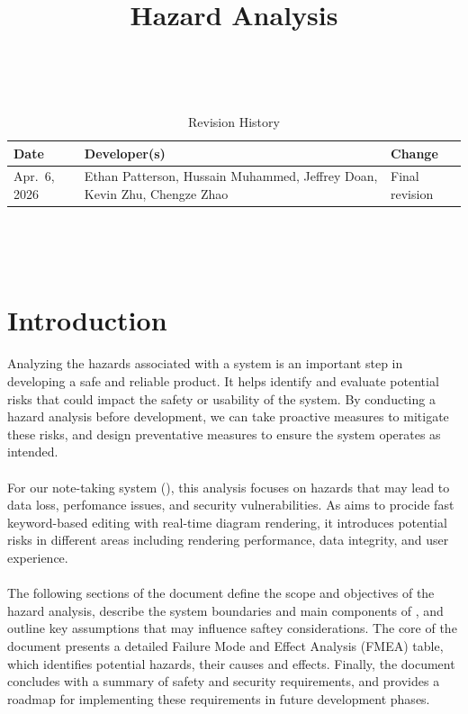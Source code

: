\documentclass{article}
\title{Hazard Analysis\\\progname}
\author{\authname}
\date{}
\begin{document}
\maketitle
\thispagestyle{empty}

~\newpage


\begin{table}[hp]
\caption{Revision History} \label{TblRevisionHistory}
\begin{tabularx}{\textwidth}{llX}
\toprule
\textbf{Date} & \textbf{Developer(s)} & \textbf{Change}\\
\midrule
Apr.\ 6, 2026 & Ethan Patterson, Hussain Muhammed, Jeffrey Doan, Kevin Zhu, Chengze Zhao & Final revision\\
\bottomrule
\end{tabularx}
\end{table}

~\newpage

\tableofcontents

~\newpage



\section{Introduction}


Analyzing the hazards associated with a system is an important step in
developing a safe and reliable product. It helps identify and evaluate
potential risks that could impact the safety or usability of the system. By
conducting a hazard analysis before development, we can take proactive measures
to mitigate these risks, and design preventative measures to ensure the system
operates as intended.
\\
\\
For our note-taking system (\progname), this analysis focuses on hazards that 
may lead to data loss, perfomance issues, and security vulnerabilities. As 
\progname aims to procide fast keyword-based editing with real-time diagram
rendering, it introduces potential risks in different areas including rendering
performance, data integrity, and user experience.
\\
\\
The following sections of the document define the scope and objectives of the 
hazard analysis, describe the system boundaries and main components of 
\progname, and outline key assumptions that may influence saftey considerations.
The core of the document presents a detailed Failure Mode and Effect Analysis
(FMEA) table, which identifies potential hazards, their causes and effects.
Finally, the document concludes with a summary of safety and security
requirements, and provides a roadmap for implementing these requirements in
future development phases.
\end{document}
